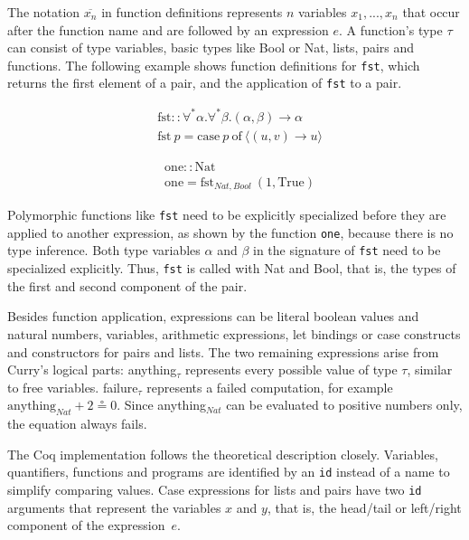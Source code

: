 \documentclass[paper = a4, fleqn, twoside]{scrreprt}
\newcommand{\coqinline}[1]{\texttt{#1}}
\begin{document}
\par
The notation $\overline{x_{n}}$ in function definitions represents $n$ variables $x_{1},...,x_{n}$ that occur after the function name and are followed by an expression $e$. A function's type $\tau$ can consist of type variables, basic types like Bool or Nat, lists, pairs and functions. The following example shows function definitions for \texttt{fst}, which returns the first element of a pair, and the application of \texttt{fst} to a pair.
\vspace*{-1em}
\begin{figure}[H]
	\begin{minipage}{.5 \linewidth}
		\begin{align*}
		&\text{fst}::\forall^{*}\alpha.\forall^{*}\beta.(\alpha, \beta) \rightarrow\alpha\\
		&\text{fst}\: p = \text{case}\: p\: \text{of}\: \langle(u,v) \rightarrow u\rangle
		\end{align*}
	\end{minipage}
	\begin{minipage}{.5 \linewidth}
		\begin{align*}
		&\text{one} :: \text{Nat}\\
		&\text{one} = \text{fst}_{Nat, Bool} ~ (1, \text{True})
		\end{align*}
	\end{minipage}
\end{figure}\noindent
Polymorphic functions like \texttt{fst} need to be explicitly specialized before they are applied to another expression, as shown by the function \texttt{one}, because there is no type inference. Both type variables $\alpha$ and $\beta$ in the signature of \texttt{fst} need to be specialized explicitly. Thus, \texttt{fst} is called with Nat and Bool, that is, the types of the first and second component of the pair.
\par
Besides function application, expressions can be literal boolean values and natural numbers, variables, arithmetic expressions, let bindings or case constructs and constructors for pairs and lists. The two remaining expressions arise from Curry's logical parts: anything$_{\tau}$ represents every possible value of type $\tau$, similar to free variables. failure$_{\tau}$ represents a failed computation, for example $\text{anything}_{Nat} + 2 \circeq 0$. Since anything$_{Nat}$ can be evaluated to positive numbers only, the equation always fails.
\par
The Coq implementation follows the theoretical description closely. Variables, quantifiers, functions and programs are identified by an \coqinline{id} instead of a name to simplify comparing values. Case expressions for lists and pairs have two \coqinline{id} arguments that represent the variables $x$ and $y$, that is, the head/tail or left/right component of the \mbox{expression $e$}.
\end{document}

